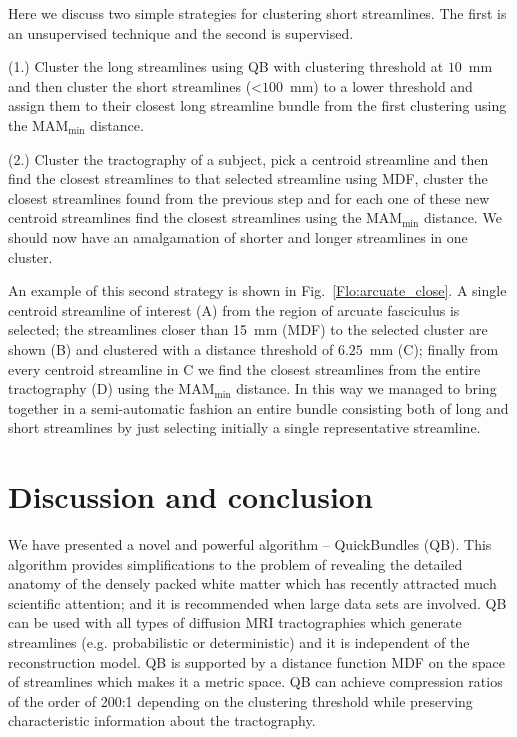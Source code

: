 \documentclass{bioinfo}
\begin{document}
Here we discuss two simple strategies for clustering short
streamlines. The first is an unsupervised technique and the second is
supervised.

(1.) Cluster the long streamlines using QB with clustering threshold at
$10$~mm and then cluster the short streamlines (<$100$~mm) to a lower
threshold and assign them to their closest long streamline bundle from
the first clustering using the $\mathrm{MAM}_{\mathrm{min}}$ distance.

(2.) Cluster the tractography of a subject, pick a centroid
streamline and then find the closest streamlines to that selected
streamline using MDF, cluster the closest streamlines found from the
previous step and for each one of these new centroid streamlines find
the closest streamlines using the $\textrm{MAM}_{\textrm{min}}$
distance. We should now have an amalgamation of shorter and longer
streamlines in one cluster.

An example of this second strategy is shown in
Fig.~\ref{Flo:arcuate_close}. A single centroid streamline of interest
(A) from the region of arcuate fasciculus is selected; the streamlines
closer than 15~mm (MDF) to the selected cluster are shown (B) and
clustered with a distance threshold of $6.25$~mm (C); finally from every
centroid streamline in C we find the closest streamlines from the entire
tractography (D) using the $\textrm{MAM}_{\textrm{min}}$ distance. In
this way we managed to bring together in a semi-automatic fashion an
entire bundle consisting both of long and short streamlines by just
selecting initially a single representative streamline.

\section{Discussion and conclusion}

We have presented a novel and powerful algorithm -- QuickBundles
(QB). This algorithm provides simplifications to the problem of
revealing the detailed anatomy of the densely packed white matter which
has recently attracted much scientific attention; and it is recommended
when large data sets are involved. QB can be used with all types of
diffusion MRI tractographies which generate streamlines
(e.g. probabilistic or deterministic) and it is independent of the
reconstruction model. QB is supported by a distance function MDF on the
space of streamlines which makes it a metric space. QB can achieve
compression ratios of the order of 200:1 depending on the clustering
threshold while preserving characteristic information about the
tractography.
\end{document}
